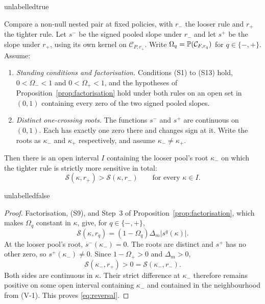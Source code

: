 \csname unlabelledtrue\endcsname
\begin{lemma}
\label{lem:reversal}
Compare a non-null nested pair at fixed policies, with $r_-$ the looser rule and $r_+$ the tighter
rule. Let $s^-$ be the signed pooled slope under $r_-$ and let $s^+$ be the slope under $r_+$,
using its own kernel on $\mathcal C_{P,r_+}$. Write
$\Omega_q=\mathbb{P}(\mathcal C_{F,r_q})$ for $q\in\{-,+\}$. Assume:
\begin{enumerate}[label=(V-\arabic*),leftmargin=3.2em,itemsep=3pt]
\item \emph{Standing conditions and factorisation.} Conditions (S1) to (S13) hold,
  $0<\Omega_-<1$ and $0<\Omega_+<1$, and the hypotheses of
  Proposition~\ref{prop:factorisation} hold under both rules on an open set in $(0,1)$ containing
  every zero of the two signed pooled slopes.
\item \emph{Distinct one-crossing roots.} The functions $s^-$ and $s^+$ are continuous on $(0,1)$.
  Each has exactly one zero there and changes sign at it. Write the roots as $\kappa_-$ and
  $\kappa_+$ respectively, and assume $\kappa_-\ne\kappa_+$.
\end{enumerate}
Then there is an open interval $I$ containing the looser pool's root $\kappa_-$ on which the tighter
rule is strictly more sensitive in total:
\begin{equation}
\label{eq:reversal}
\mathcal S(\kappa,r_+)>\mathcal S(\kappa,r_-)
\qquad\text{for every }\kappa\in I.
\end{equation}
\end{lemma}
\csname unlabelledfalse\endcsname

\begin{proof}
Factorisation, (S9), and Step~3 of Proposition~\ref{prop:factorisation}, which makes $\Omega_q$
constant in $\kappa$, give, for $q\in\{-,+\}$,
\[
\mathcal S(\kappa,r_q)=(1-\Omega_q)\Delta_m|s^q(\kappa)|.
\]
At the looser pool's root, $s^-(\kappa_-)=0$. The roots are distinct and $s^+$ has no other zero,
so $s^+(\kappa_-)\ne0$. Since $1-\Omega_+>0$ and $\Delta_m>0$,
\[
\mathcal S(\kappa_-,r_+)>0=\mathcal S(\kappa_-,r_-).
\]
Both sides are continuous in $\kappa$. Their strict difference at $\kappa_-$ therefore remains
positive on some open interval containing $\kappa_-$ and contained in the neighbourhood from
(V-1). This proves \eqref{eq:reversal}.
\end{proof}

